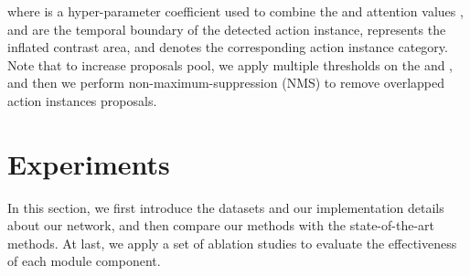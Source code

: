 \documentclass[journal,comsoc]{IEEEtran}
\begin{document}
where  is a hyper-parameter coefficient used to combine the  and attention values ,  and  are the
temporal boundary of the detected action instance,  represents the inflated contrast area, and  denotes the corresponding action instance category. Note that to increase proposals pool, we apply multiple thresholds on the  and , and then we perform non-maximum-suppression (NMS) to remove overlapped action instances proposals.

\section{Experiments}
\par In this section, we first introduce the datasets and our implementation details about our network, and then compare our methods with the state-of-the-art methods. At last, we apply a set of ablation studies to evaluate the effectiveness of each module component. 
\end{document}
